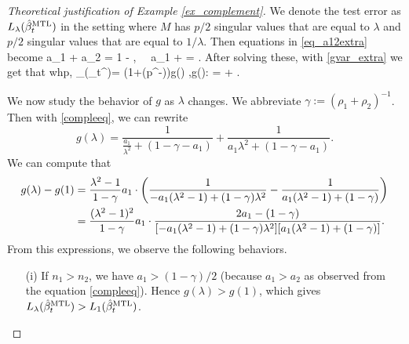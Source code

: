 \begin{proof}[Theoretical justification of Example \ref{ex_complement}]
We denote the test error as $L_\lambda(\hat \beta_{t}^{\text{MTL}})$ in the setting where $M$ has $p/2$ singular values that are equal to $\lambda$ and $p/2$ singular values that are equal to $1 / \lambda$. Then equations in \eqref{eq_a12extra} become
\be\label{compleeq} a_1 + a_2 = 1 - ,  \ \ a_1 + \cdot {} = . \ee
After solving these, with \eqref{gvar_extra} we get that whp,
\be\label{testcomple}
 \te_\lambda(\hat \beta_{t}^{\MTL})= (1+\OO(p^{-\e}))\cdot g(\lambda) ,\quad g(\lambda): =  + .\ee


We now study the behavior of $g$ as $\lambda$ changes. 
We abbreviate $\gamma:=(\rho_1 + \rho_2)^{-1}$. Then with \eqref{compleeq}, we can rewrite
$$g(\lambda)= \frac{1}{\frac{a_1}{\lambda^2} + (1-\gamma - a_1)} + \frac{1}{a_1\lambda^2 + (1-\gamma - a_1)}.$$
We can compute that
\begin{align*}
g(\lambda) - g(1)&= \frac{ \lambda^2-1}{1-\gamma} a_1\cdot \left({  \frac{1}{ -a_1(\lambda^2-1)+(1-\gamma)\lambda^2 } - \frac{1}{a_1(\lambda^2-1) + (1-\gamma)}}\right) \\
&= \frac{(\lambda^2-1)^2}{1-\gamma}  a_1\cdot  \frac{2a_1 - (1-\gamma) }{[-a_1(\lambda^2-1)+(1-\gamma)\lambda^2 ][a_1(\lambda^2-1) + (1-\gamma)]} .
\end{align*}
From this expressions, we observe the following behaviors.
\begin{itemize}
\item[(i)] If $n_1>n_2$, we have $a_1>(1-\gamma)/2$ (because $a_1>a_2$ as observed from the equation \eqref{compleeq}). Hence $g(\lambda)>g(1)$, which gives $L_\lambda(\hat \beta_{t}^{\text{MTL}})>L_1(\hat \beta_{t}^{\text{MTL}})$.


\end{itemize}
\end{proof}
